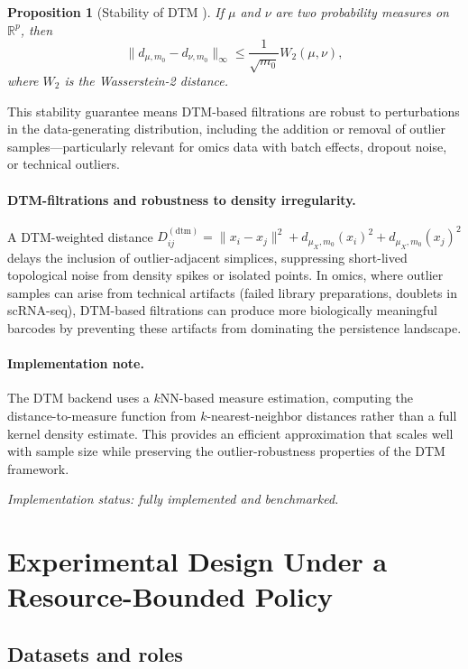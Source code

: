 \documentclass[11pt]{article}
\newtheorem{proposition}[theorem]{Proposition}
\begin{document}
\begin{proposition}[Stability of DTM \cite{chazal2011dtm}]\label{prop:dtm}
If $\mu$ and $\nu$ are two probability measures on $\mathbb{R}^p$, then
\[
\|d_{\mu, m_0} - d_{\nu, m_0}\|_\infty \le \frac{1}{\sqrt{m_0}} W_2(\mu, \nu),
\]
where $W_2$ is the Wasserstein-2 distance.
\end{proposition}

This stability guarantee means DTM-based filtrations are robust to perturbations in the data-generating distribution, including the addition or removal of outlier samples---particularly relevant for omics data with batch effects, dropout noise, or technical outliers.

\paragraph{DTM-filtrations and robustness to density irregularity.}
A DTM-weighted distance $D^{(\text{dtm})}_{ij} = \|x_i - x_j\|^2 + d_{\mu_X, m_0}(x_i)^2 + d_{\mu_X, m_0}(x_j)^2$ delays the inclusion of outlier-adjacent simplices, suppressing short-lived topological noise from density spikes or isolated points.
In omics, where outlier samples can arise from technical artifacts (failed library preparations, doublets in scRNA-seq), DTM-based filtrations can produce more biologically meaningful barcodes by preventing these artifacts from dominating the persistence landscape.

\paragraph{Implementation note.}
The DTM backend uses a $k$NN-based measure estimation, computing the distance-to-measure function from $k$-nearest-neighbor distances rather than a full kernel density estimate.
This provides an efficient approximation that scales well with sample size while preserving the outlier-robustness properties of the DTM framework.

\emph{Implementation status: fully implemented and benchmarked.}

\section{Experimental Design Under a Resource-Bounded Policy}
\label{sec:experimental}

\subsection{Datasets and roles}
\end{document}
